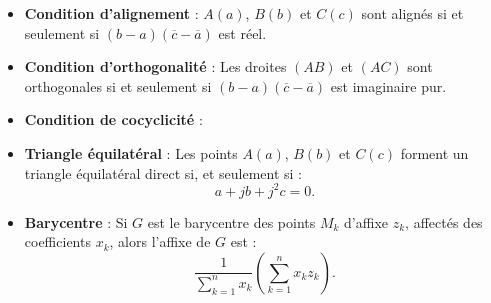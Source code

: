 \documentclass[12pt,a4paper]{article}
\begin{document}
\begin{itemize}
    \item \textbf{Condition d'alignement} :  
    $A(a)$, $B(b)$ et $C(c)$ sont alignés si et seulement si $(b - a)(\overline{c} - \overline{a})$ est réel.

    \item \textbf{Condition d'orthogonalité} :  
    Les droites $(AB)$ et $(AC)$ sont orthogonales si et seulement si $(b - a)(\overline{c} - \overline{a})$ est imaginaire pur.

    \item \textbf{Condition de cocyclicité} :  






    \item \textbf{Triangle équilatéral} :  
    Les points $A(a)$, $B(b)$ et $C(c)$ forment un triangle équilatéral direct si, et seulement si :  
    \[
    a + j b + j^2 c = 0.
    \]

    \item \textbf{Barycentre} :  
    Si $G$ est le barycentre des points $M_k$ d’affixe $z_k$, affectés des coefficients $x_k$, alors l’affixe de $G$ est :
    \[
    \frac{1}{\sum_{k=1}^n x_k} \left( \sum_{k=1}^n x_k z_k \right).
    \]
\end{itemize}
\end{document}
